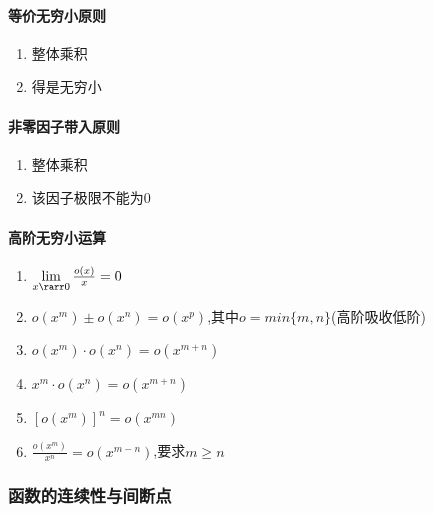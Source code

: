 \documentclass[
]{article}
\begin{document}
\hypertarget{ux7b49ux4ef7ux65e0ux7a77ux5c0fux539fux5219}{%
\paragraph{等价无穷小原则}\label{ux7b49ux4ef7ux65e0ux7a77ux5c0fux539fux5219}}

\begin{enumerate}
\def\labelenumi{\arabic{enumi}.}
\item
  整体乘积
\item
  得是无穷小
\end{enumerate}

\hypertarget{ux975eux96f6ux56e0ux5b50ux5e26ux5165ux539fux5219}{%
\paragraph{非零因子带入原则}\label{ux975eux96f6ux56e0ux5b50ux5e26ux5165ux539fux5219}}

\begin{enumerate}
\def\labelenumi{\arabic{enumi}.}
\item
  整体乘积
\item
  该因子极限不能为0
\end{enumerate}

\hypertarget{ux9ad8ux9636ux65e0ux7a77ux5c0fux8fd0ux7b97}{%
\paragraph{高阶无穷小运算}\label{ux9ad8ux9636ux65e0ux7a77ux5c0fux8fd0ux7b97}}

\begin{enumerate}
\def\labelenumi{\arabic{enumi}.}
\item
  \(\lim \limits _{x \rarr 0} \frac{o(x)}{x} = 0\)
\item
  \(o(x^m) \pm o(x^n) = o(x^p)\),其中\(o=min\{m,n\}\)(高阶吸收低阶)
\item
  \(o(x^m) \cdot o(x^n) = o(x^{m+n})\)
\item
  \(x^m \cdot o(x^n) = o(x^{m+n})\)
\item
  \([o(x^m)]^n=o(x^{mn})\)
\item
  \(\frac{o(x^m)}{x^n}= o(x^{m-n})\),要求\(m\ge n\)
\end{enumerate}

\hypertarget{ux51fdux6570ux7684ux8fdeux7eedux6027ux4e0eux95f4ux65adux70b9}{%
\subsubsection{函数的连续性与间断点}\label{ux51fdux6570ux7684ux8fdeux7eedux6027ux4e0eux95f4ux65adux70b9}}
\end{document}
